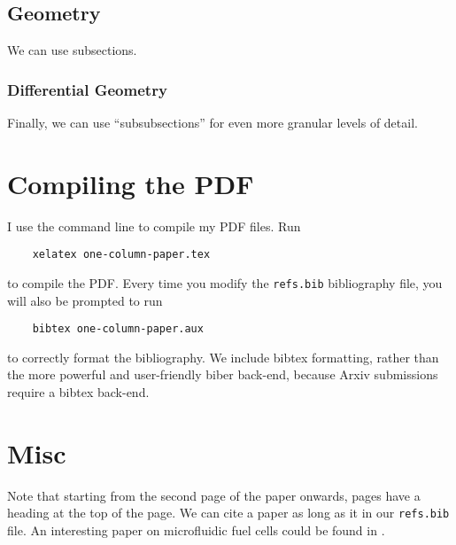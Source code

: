 \documentclass[11pt,notitlepage]{article}
\begin{document}
\subsection{Geometry}

We can use subsections.



%
%

\subsubsection{Differential Geometry}

Finally, we can use ``subsubsections'' for even more granular levels of detail.



%
%

\section{Compiling the PDF}

I use the command line to compile my PDF files.
Run
\begin{verbatim}
	xelatex one-column-paper.tex
\end{verbatim}
to compile the PDF.
Every time you modify the \verb+refs.bib+ bibliography file, you will also be prompted to run
\begin{verbatim}
	bibtex one-column-paper.aux
\end{verbatim}
to correctly format the bibliography.
We include bibtex formatting, rather than the more powerful and user-friendly biber back-end, because Arxiv submissions require a bibtex back-end.



%
%

\section{Misc}

Note that starting from the second page of the paper onwards, pages have a heading at the top of the page.
We can cite a paper as long as it in our \verb+refs.bib+ file.
An interesting paper on microfluidic fuel cells could be found in \cite{vigolo-stone-rsc-2014}.




%
%

\newpage
{}


\end{document}
